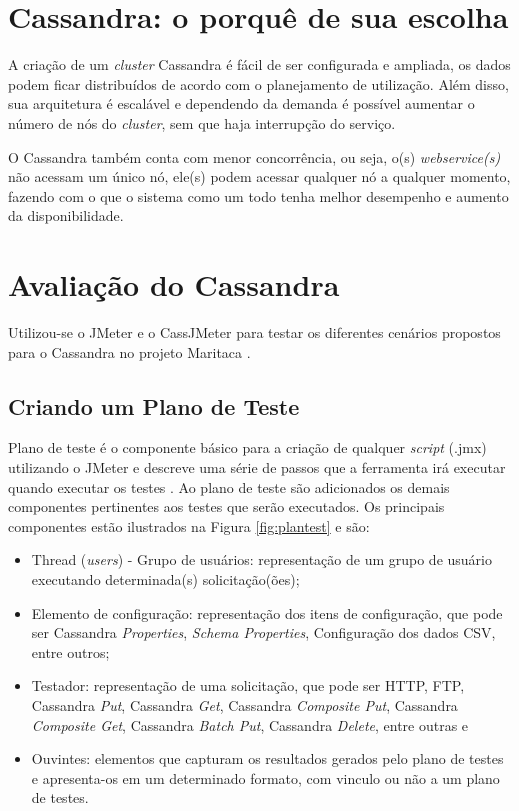     
\section{Cassandra: o porquê de sua escolha}

A criação de um \textit{cluster} Cassandra é fácil de ser configurada e ampliada, os dados podem ficar distribuídos de acordo com o planejamento de utilização. Além disso, sua arquitetura é escalável e dependendo da demanda é possível aumentar o número de nós do \textit{cluster}, sem que haja interrupção do serviço.

O Cassandra também conta com menor concorrência, ou seja, o(s) \textit{webservice(s)} não acessam um único nó, ele(s) podem acessar qualquer nó a qualquer momento, fazendo com o que o sistema como um todo tenha melhor desempenho e aumento da disponibilidade.


\section{Avaliação do Cassandra}

Utilizou-se o JMeter e o CassJMeter para testar os diferentes cenários propostos para o Cassandra no projeto Maritaca \cite{DenisSheahan2012}.

\subsection{Criando um Plano de Teste}

Plano de teste é o componente básico para a criação de qualquer \textit{script} (.jmx) utilizando o JMeter e descreve uma série de passos que a ferramenta irá executar quando executar os testes \cite{De2013}. Ao plano de teste são adicionados os demais componentes pertinentes aos testes que serão executados. Os principais componentes estão ilustrados na Figura \ref{fig:plantest} e são:

\begin{itemize}
\item Thread (\textit{users}) - Grupo de usuários: representação de um grupo de usuário executando determinada(s) solicitação(ões);
\item Elemento de configuração: representação dos itens de configuração, que pode ser Cassandra \textit{Properties}, \textit{Schema Properties}, Configuração dos dados CSV, entre outros;
\item Testador: representação de uma solicitação, que pode ser HTTP, FTP, Cassandra \textit{Put}, Cassandra \textit{Get}, Cassandra \textit{Composite Put}, Cassandra \textit{Composite Get}, Cassandra \textit{Batch Put}, Cassandra \textit{Delete}, entre outras e
\item Ouvintes: elementos que capturam os resultados gerados pelo plano de testes e apresenta-os em um determinado formato, com vinculo ou não a um plano de testes.

\end{itemize}

